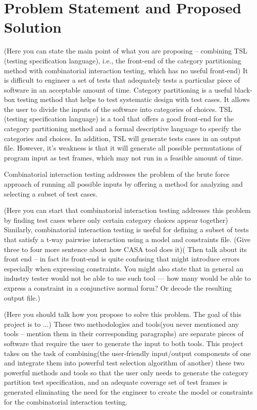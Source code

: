 \documentclass[a4full,12pt]{article}
\newcommand{\eas}[1]{{\color{blue}\sf ({#1})}}
\begin{document}
\section{Problem Statement and Proposed Solution}
  \eas{Here you can state the main point of what you are proposing -- combining TSL (testing specification language), i.e., the front-end of the category partitioning method with combinatorial interaction testing, which has no useful front-end}
It is difficult to engineer a set of tests that adequately tests a particular piece of software
  in an acceptable amount of time. Category partitioning is a useful black-box testing method that
  helps to test systematic design with test cases. It allows the user to divide
  the inputs of the software into categories of choices. TSL (testing specification language) is a tool
  that offers a good front-end for the category partitioning method and a formal descriptive language
  to specify the categories and choices. In addition, TSL will generate tests cases in an output file.
  However, it's weakness is that it will generate all possible permutations of program input as test
  frames, which may not run in a feasible amount of time.
  
Combinatorial interaction testing addresses the problem of the brute force approach of running all
  possible inputs by offering a method for analyzing and selecting a subset of test cases.


\eas{Here you can start that combinatorial interaction testing addresses this problem by finding test cases where only certain category choices appear together}
 Similarly, combinatorial interaction testing is useful for defining a subset of tests that satisfy a t-way pairwise interaction using a model and constraints file. \eas{Give three to four more sentence about how  CASA tool does it}\eas{ Then talk about its front end -- in fact its front-end is quite confusing that might introduce errors especially when expressing constraints. You might also state that in general an industry tester would not be able to use such tool --- how many would be able to express a constraint in a conjunctive normal form? Or decode the resulting output file.}
 
\eas{Here you should talk how you propose to solve this problem. The goal of this project is to ...} These two methodologies and tools\eas{you never mentioned any tools -- mention them in their corresponding paragraphs} are separate pieces of software that require the user  to generate the input to both tools. This project takes on the task of combining\eas{the user-friendly input/output components of one and integrate them into powerful test selection algorithm of another} these two powerful methods and tools so that the user only needs to generate the category partition test specification, and an adequate coverage set of test frames is generated eliminating the need for the engineer to create the model or constraints for the combinatorial interaction testing.
\end{document}
